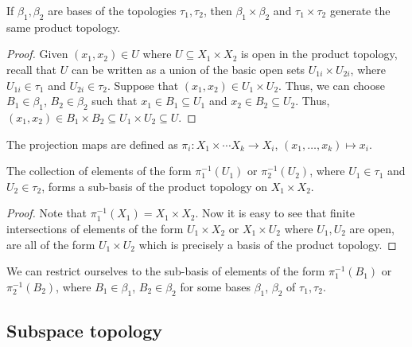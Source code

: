 \documentclass[11pt]{article}
\theoremstyle{definition}
\theoremstyle{remark}
\numberwithin{equation}{section}
\begin{document}
    \begin{lemma}
        If $\beta_1, \beta_2$ are bases of the topologies $\tau_1, \tau_2$, then
        $\beta_1 \times \beta_2$ and $\tau_1 \times \tau_2$ generate the same product
        topology.
    \end{lemma}
    \begin{proof}
        Given $(x_1, x_2) \in U$ where $U \subseteq X_1\times X_2$ is open in the
        product topology, recall that $U$ can be written as a union of the basic open
        sets $U_{1i} \times U_{2i}$, where $U_{1i} \in \tau_1$ and $U_{2i} \in
        \tau_2$. Suppose that $(x_1, x_2) \in U_1 \times U_2$. Thus, we can choose
        $B_1 \in \beta_1$, $B_2 \in \beta_2$ such that $x_1 \in B_1 \subseteq U_1$
        and $x_2 \in B_2 \subseteq U_2$. Thus, $(x_1, x_2) \in B_1 \times B_2
        \subseteq U_1 \times U_2 \subseteq U$.
    \end{proof}

    \begin{definition}
        The projection maps are defined as $\pi_i\colon X_1 \times \cdots X_k \to
        X_i$, $(x_1, \dots, x_k) \mapsto x_i$.
    \end{definition}

    \begin{lemma}
        The collection of elements of the form $\pi_1^{-1}(U_1)$ or
        $\pi_2^{-1}(U_2)$, where $U_1 \in \tau_1$ and $U_2 \in \tau_2$, forms a
        sub-basis of the product topology on $X_1 \times X_2$.
    \end{lemma}
    \begin{proof}
        Note that $\pi_1^{-1}(X_1) = X_1 \times X_2$. Now it is easy to see that
        finite intersections of elements of the form $U_1 \times X_2$ or $X_1 \times
        U_2$ where $U_1, U_2$ are open, are all of the form $U_1 \times U_2$ which is
        precisely a basis of the product topology.
    \end{proof}
    \begin{corollary}
        We can restrict ourselves to the sub-basis of elements of the form
        $\pi_1^{-1}(B_1)$ or $\pi_2^{-1}(B_2)$, where $B_1 \in \beta_1$, $B_2 \in
        \beta_2$ for some bases $\beta_1$, $\beta_2$ of $\tau_1, \tau_2$.
    \end{corollary}


    \subsection{Subspace topology}
    
\end{document}
